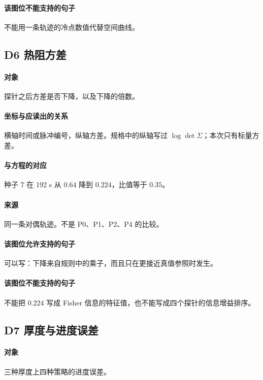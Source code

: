 \paragraph{该图位不能支持的句子}
不能用一条轨迹的冷点数值代替空间曲线。

\subsection{D6 热阻方差}
\paragraph{对象}
探针之后方差是否下降，以及下降的倍数。

\paragraph{坐标与应读出的关系}
横轴时间或脉冲编号，纵轴方差。规格中的纵轴写过 $\log\det\Sigma$；本次只有标量方差。

\paragraph{与方程的对应}
种子 7 在 192 s 从 $0.64$ 降到 $0.224$，比值等于 $0.35$。

\paragraph{来源}
同一条对偶轨迹。不是 P0、P1、P2、P4 的比较。

\paragraph{该图位允许支持的句子}
可以写：下降来自规则中的乘子，而且只在更接近真值参照时发生。

\paragraph{该图位不能支持的句子}
不能把 $0.224$ 写成 Fisher 信息的特征值，也不能写成四个探针的信息增益排序。

\subsection{D7 厚度与进度误差}
\paragraph{对象}
三种厚度上四种策略的进度误差。

